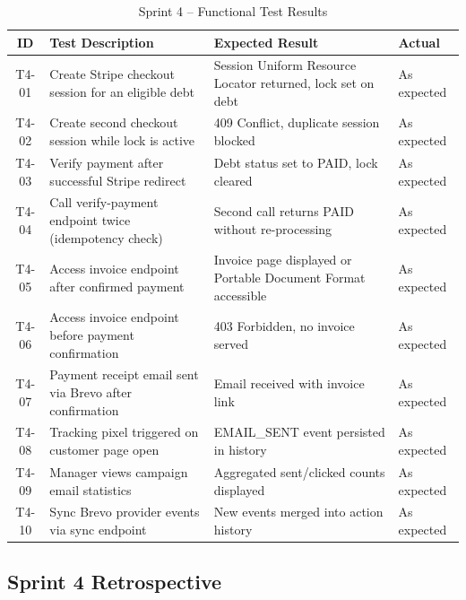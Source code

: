 \documentclass[12pt,a4paper]{report}
\newcommand{\reporttablesetup}{%
  \small%
  \setlength{\tabcolsep}{5pt}%
  \renewcommand{\arraystretch}{1.38}%
  \arrayrulecolor{framegray}%
}
\begin{document}
\begin{table}[H]
  \centering
  \renewcommand{\arraystretch}{1.3}
  \footnotesize\reporttablesetup
  \begin{tabularx}{\textwidth}{|c|Y|p{3.85cm}|p{1.8cm}|}
    \hline
    \textbf{ID} & \textbf{Test Description} & \textbf{Expected Result} & \textbf{Actual} \\
    \hline
    T4-01 & Create Stripe checkout session for an eligible debt       & Session Uniform Resource Locator returned, lock set on debt    & As expected \\
    \hline
    T4-02 & Create second checkout session while lock is active       & 409 Conflict, duplicate session blocked   & As expected \\
    \hline
    T4-03 & Verify payment after successful Stripe redirect            & Debt status set to PAID, lock cleared     & As expected \\
    \hline
    T4-04 & Call verify-payment endpoint twice (idempotency check)    & Second call returns PAID without re-processing & As expected \\
    \hline
    T4-05 & Access invoice endpoint after confirmed payment            & Invoice page displayed or Portable Document Format accessible  & As expected \\
    \hline
    T4-06 & Access invoice endpoint before payment confirmation        & 403 Forbidden, no invoice served          & As expected \\
    \hline
    T4-07 & Payment receipt email sent via Brevo after confirmation   & Email received with invoice link          & As expected \\
    \hline
    T4-08 & Tracking pixel triggered on customer page open            & EMAIL\_SENT event persisted in history    & As expected \\
    \hline
    T4-09 & Manager views campaign email statistics                   & Aggregated sent/clicked counts displayed  & As expected \\
    \hline
    T4-10 & Sync Brevo provider events via sync endpoint              & New events merged into action history     & As expected \\
    \hline
  \end{tabularx}
  \caption{Sprint 4 -- Functional Test Results}
  \label{tab:test-s4}
\end{table}

\subsection{Sprint 4 Retrospective}
\end{document}

